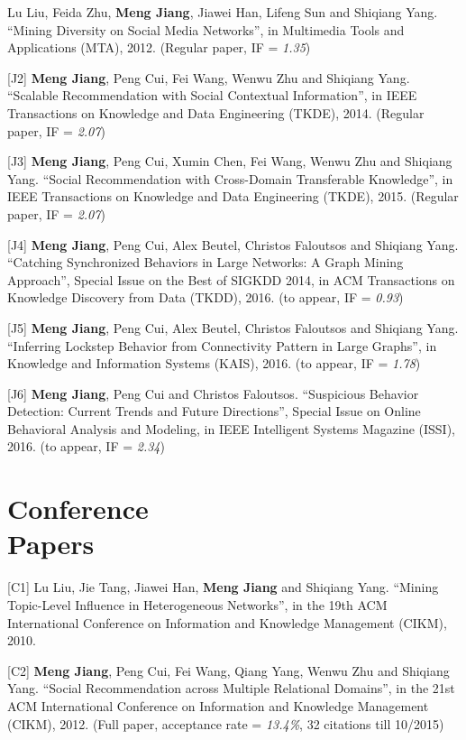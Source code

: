 \documentclass[margin, 10pt]{res} %
\begin{document}
\begin{resume}
[J1] Lu Liu, Feida Zhu, {\bf Meng Jiang}, Jiawei Han, Lifeng Sun and Shiqiang Yang. ``Mining Diversity on Social Media Networks'', in Multimedia Tools and Applications (MTA), 2012. (Regular paper, IF = {\em 1.35})

[J2] {\bf Meng Jiang}, Peng Cui, Fei Wang, Wenwu Zhu and Shiqiang Yang. ``Scalable Recommendation with Social Contextual Information'', in IEEE Transactions on Knowledge and Data Engineering (TKDE), 2014. (Regular paper, IF = {\em 2.07})

[J3] {\bf Meng Jiang}, Peng Cui, Xumin Chen, Fei Wang, Wenwu Zhu and Shiqiang Yang. ``Social Recommendation with Cross-Domain Transferable Knowledge'', in IEEE Transactions on Knowledge and Data Engineering (TKDE), 2015. (Regular paper, IF = {\em 2.07})

[J4] {\bf Meng Jiang}, Peng Cui, Alex Beutel, Christos Faloutsos and Shiqiang Yang. ``Catching Synchronized Behaviors in Large Networks: A Graph Mining Approach'', Special Issue on the Best of SIGKDD 2014, in ACM Transactions on Knowledge Discovery from Data (TKDD), 2016. (to appear, IF = {\em 0.93})

[J5] {\bf Meng Jiang}, Peng Cui, Alex Beutel, Christos Faloutsos and Shiqiang Yang. ``Inferring Lockstep Behavior from Connectivity Pattern in Large Graphs'', in Knowledge and Information Systems (KAIS), 2016. (to appear, IF = {\em 1.78})

[J6] {\bf Meng Jiang}, Peng Cui and Christos Faloutsos. ``Suspicious Behavior Detection: Current Trends and Future Directions'', Special Issue on Online Behavioral Analysis and Modeling, in IEEE Intelligent Systems Magazine (ISSI), 2016. (to appear, IF = {\em 2.34})


\section{Conference \\ Papers}

[C1] Lu Liu, Jie Tang, Jiawei Han, {\bf Meng Jiang} and Shiqiang Yang. ``Mining Topic-Level Influence in Heterogeneous Networks'', in the 19th ACM International Conference on Information and Knowledge Management (CIKM), 2010.

[C2] {\bf Meng Jiang}, Peng Cui, Fei Wang, Qiang Yang, Wenwu Zhu and Shiqiang Yang. ``Social Recommendation across Multiple Relational Domains'', in the 21st ACM International Conference on Information and Knowledge Management (CIKM), 2012. (Full paper, acceptance rate = {\em 13.4\%}, 32 citations till 10/2015)


\end{resume}
\end{document}
